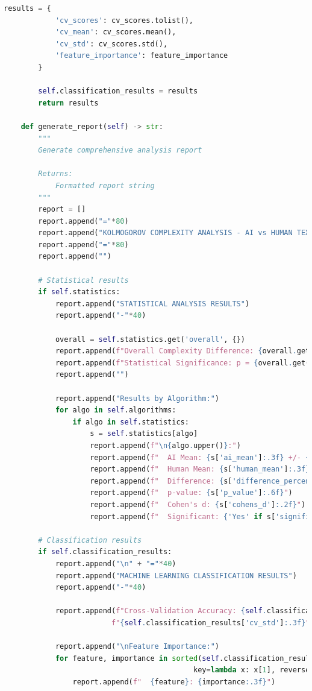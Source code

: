 \documentclass[12pt,a4paper]{report}
\begin{document}
\begin{lstlisting}[language=Python, caption=Complete Compression Analysis Framework]
        results = {
            'cv_scores': cv_scores.tolist(),
            'cv_mean': cv_scores.mean(),
            'cv_std': cv_scores.std(),
            'feature_importance': feature_importance
        }

        self.classification_results = results
        return results

    def generate_report(self) -> str:
        """
        Generate comprehensive analysis report

        Returns:
            Formatted report string
        """
        report = []
        report.append("="*80)
        report.append("KOLMOGOROV COMPLEXITY ANALYSIS - AI vs HUMAN TEXT DETECTION")
        report.append("="*80)
        report.append("")

        # Statistical results
        if self.statistics:
            report.append("STATISTICAL ANALYSIS RESULTS")
            report.append("-"*40)

            overall = self.statistics.get('overall', {})
            report.append(f"Overall Complexity Difference: {overall.get('difference_percent', 0):.1f}%")
            report.append(f"Statistical Significance: p = {overall.get('p_value', 1):.6f}")
            report.append("")

            report.append("Results by Algorithm:")
            for algo in self.algorithms:
                if algo in self.statistics:
                    s = self.statistics[algo]
                    report.append(f"\n{algo.upper()}:")
                    report.append(f"  AI Mean: {s['ai_mean']:.3f} +/- {s['ai_std']:.3f}")
                    report.append(f"  Human Mean: {s['human_mean']:.3f} +/- {s['human_std']:.3f}")
                    report.append(f"  Difference: {s['difference_percent']:.1f}%")
                    report.append(f"  p-value: {s['p_value']:.6f}")
                    report.append(f"  Cohen's d: {s['cohens_d']:.2f}")
                    report.append(f"  Significant: {'Yes' if s['significant'] else 'No'}")

        # Classification results
        if self.classification_results:
            report.append("\n" + "="*40)
            report.append("MACHINE LEARNING CLASSIFICATION RESULTS")
            report.append("-"*40)

            report.append(f"Cross-Validation Accuracy: {self.classification_results['cv_mean']:.3f} +/- "
                         f"{self.classification_results['cv_std']:.3f}")

            report.append("\nFeature Importance:")
            for feature, importance in sorted(self.classification_results['feature_importance'].items(),
                                            key=lambda x: x[1], reverse=True):
                report.append(f"  {feature}: {importance:.3f}")


\end{lstlisting}
\end{document}
